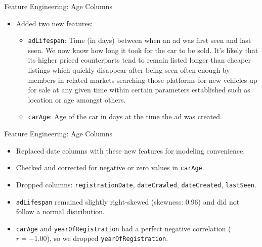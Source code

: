 \documentclass{beamer}
\begin{document}
\begin{frame}{Feature Engineering: Age Columns}
        \begin{itemize}
                \item Added two new features:
                        \begin{itemize}
                                \justifying
                                        \vspace{0.25em}
                                \item \texttt{adLifespan}: Time (in days)
                                        between when an ad was first seen and
                                        last seen. We now know how long it took
                                        for the car to be sold. It’s likely
                                        that its higher priced counterparts
                                        tend to remain listed longer than
                                        cheaper listings which quickly
                                        disappear after being seen often enough
                                        by members in related markets searching
                                        those platforms for new vehicles up for
                                        sale at any given time within certain
                                        parameters established such as location
                                        or age amongst others.
                                        \vspace{0.25em}
                                \item \texttt{carAge}: Age of the car in days
                                        at the time the ad was created.
                        \end{itemize}
        \end{itemize}
\end{frame}

\begin{frame}{Feature Engineering: Age Columns}
        \begin{itemize}
                \item Replaced date columns with these new features for
                        modeling convenience.
                \item Checked and corrected for negative or zero values in
                        \texttt{carAge}.
                \item Dropped columns: \texttt{registrationDate},
                        \texttt{dateCrawled}, \texttt{dateCreated},
                        \texttt{lastSeen}.
                \item \texttt{adLifespan} remained slightly right-skewed
                        (skewness: 0.96) and did not follow a normal
                        distribution.
                \item \texttt{carAge} and \texttt{yearOfRegistration} had a
                        perfect negative correlation ($r = -1.00$), so we
                        dropped \texttt{yearOfRegistration}.
        \end{itemize}
\end{frame}
\end{document}
